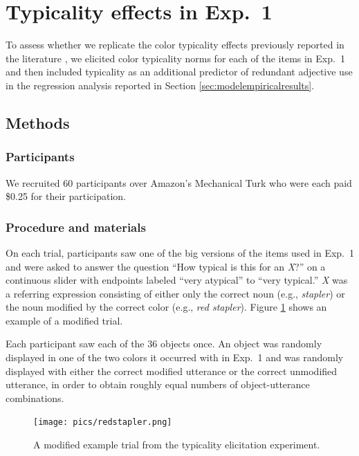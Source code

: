 \documentclass[11pt]{article}
\newcommand{\figref}[1]{Figure \ref{#1}}
\newcommand{\sectionref}[1]{Section \ref{#1}}
\begin{document}
\section{Typicality effects in Exp.~1}
\label{sec:exp1typicality}

To assess whether we replicate the color typicality effects previously reported in the literature \cite{sedivy2003a, Westerbeek2015, rubiofernandez2016}, we elicited color typicality norms for each of the items in Exp.~1 and then included typicality as an additional predictor of redundant adjective use in the regression analysis reported in \sectionref{sec:modelempiricalresults}. 

\subsection{Methods}

\subsubsection{Participants}

We recruited 60 participants over Amazon's Mechanical Turk who were each paid \$0.25 for their participation.

\subsubsection{Procedure and materials}

On each trial, participants saw one of the big versions of the items used in Exp.~1 and were asked to answer the question ``How typical is this for an \emph{X}?'' on a continuous slider with endpoints labeled ``very atypical'' to ``very typical.'' \emph{X} was a referring expression consisting of either only the correct noun (e.g., \emph{stapler}) or the noun modified by the correct color (e.g., \emph{red stapler}). \figref{fig:modifiertypstimulus} shows an example of a modified trial.

Each participant saw each of the 36 objects once. An object was randomly displayed in one of the two colors it occurred with in Exp.~1 and was randomly displayed with either the correct modified utterance or the correct unmodified utterance, in order to obtain roughly equal numbers of object-utterance combinations.

\begin{figure}
\centering
\texttt{[image: pics/redstapler.png]}
\caption{A modified example trial from the typicality elicitation experiment.}
\label{fig:modifiertypstimulus}
\end{figure}
\end{document}
